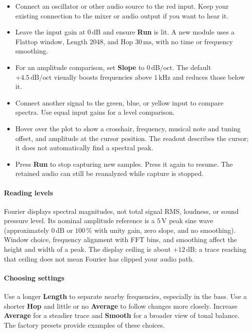 \documentclass[12pt,letterpaper]{article}
\begin{document}
\begin{itemize}
  \item Connect an oscillator or other audio source to the red input. Keep
  your existing connection to the mixer or audio output if you want to hear it.
  \item Leave the input gain at $0\,\mathrm{dB}$ and ensure \textbf{Run} is lit.
  A new module uses a Flattop window, Length 2048, and Hop
  $30\,\mathrm{ms}$, with no time or frequency smoothing.
  \item For an amplitude comparison, set \textbf{Slope} to
  $0\,\mathrm{dB/oct}$. The default $+4.5\,\mathrm{dB/oct}$ visually boosts
  frequencies above $1\,\mathrm{kHz}$ and reduces those below it.
  \item Connect another signal to the green, blue, or yellow input to
  compare spectra. Use equal input gains for a level comparison.
  \item Hover over the plot to show a crosshair, frequency, musical note
  and tuning offset, and amplitude at the cursor position. The readout
  describes the cursor; it does not automatically find a spectral peak.
  \item Press \textbf{Run} to stop capturing new samples. Press it again
  to resume. The retained audio can still be reanalyzed while capture is stopped.
\end{itemize}

\paragraph{Reading levels}
Fourier displays spectral magnitudes, not total signal RMS, loudness, or
sound pressure level. Its nominal amplitude reference is a
$5\,\mathrm{V}$ peak sine wave (approximately $0\,\mathrm{dB}$ or
$100\,\%$ with unity gain, zero slope, and no smoothing). Window choice,
frequency alignment with FFT bins, and smoothing affect the height and width
of a peak. The display ceiling is about $+12\,\mathrm{dB}$; a trace reaching
that ceiling does not mean Fourier has clipped your audio path.

\paragraph{Choosing settings}
Use a longer \textbf{Length} to separate nearby frequencies, especially in
the bass. Use a shorter \textbf{Hop} and little or no \textbf{Average} to
follow changes more closely. Increase \textbf{Average} for a steadier trace
and \textbf{Smooth} for a broader view of tonal balance. The factory presets
provide examples of these choices.
\end{document}
